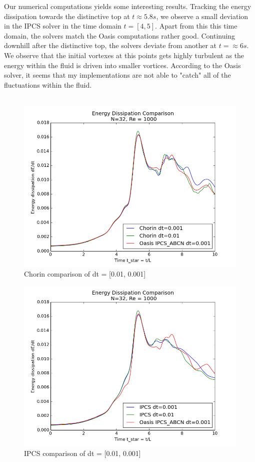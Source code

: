 \documentclass[a4paper,norsk]{article}
\begin{document}
Our numerical computations yields some interesting results. Tracking the energy dissipation towards the distinctive top at $t \approx 5.8 s$, we observe a small deviation in the IPCS solver in the time domain $t = [4, 5]$. Apart from this this time domain, the solvers match the Oasis computations rather good. Continuing downhill after the distinctive top, the solvers deviate from another at $t = \approx 6 s$. We observe that the initial vortexes at this points gets highly turbulent as the energy within the fluid is driven into smaller vortices. According to the Oasis solver, it seems that my implementations are not able to "catch" all of the fluctuations within the fluid.
\\ \\
\newpage
\begin{figure}[h!]
	\centering
	\caption*{Chorin comparison of dt = [0.01, 0.001]}
    \includegraphics[scale=0.5]{results/plots/chorin_comp2.png}
\end{figure}
\begin{figure}[h!]
	\centering
	\caption*{IPCS comparison of dt = [0.01, 0.001]}
    \includegraphics[scale=0.5]{results/plots/ipcs_comp2.png}
\end{figure}
\end{document}
